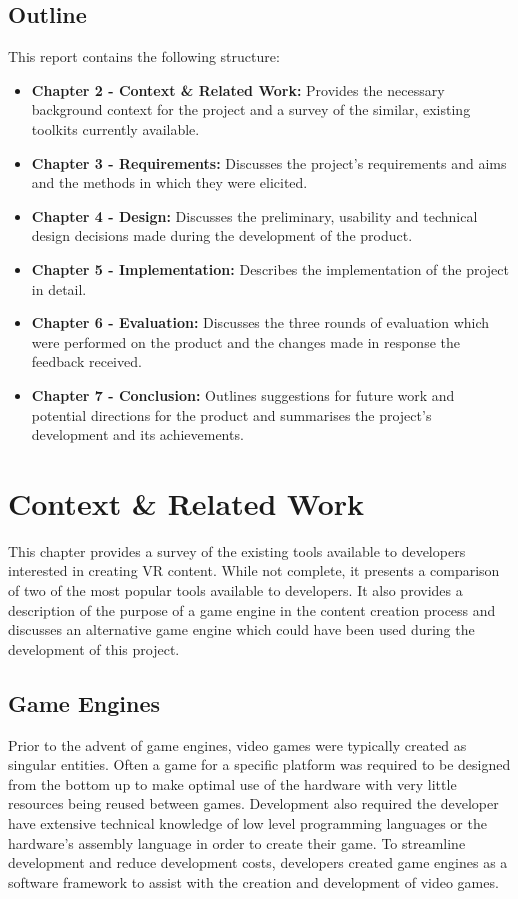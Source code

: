 \documentclass{l4proj}
\begin{document}
\section{Outline}
\label{sec:introductionoutline}
This report contains the following structure:
\begin{itemize}
    \item \textbf{Chapter 2 - Context \& Related Work:} Provides the necessary background context for the project and a survey of the similar, existing toolkits currently available.
    \item \textbf{Chapter 3 - Requirements:} Discusses the project's requirements and aims and the methods in which they were elicited.
    \item \textbf{Chapter 4 - Design:} Discusses the preliminary, usability and technical design decisions made during the development of the product.
    \item \textbf{Chapter 5 - Implementation:} Describes the implementation of the project in detail.  
    \item \textbf{Chapter 6 - Evaluation:} Discusses the three rounds of evaluation which were performed on the product and the changes made in response the feedback received.
    \item \textbf{Chapter 7 - Conclusion:} Outlines suggestions for future work and potential directions for the product and summarises the project's development and its achievements.
\end{itemize}

\chapter{Context \& Related Work}
\label{sec:contextchapter}
This chapter provides a survey of the existing tools available to developers interested in creating VR content. While not complete, it presents a comparison of two of the most popular tools available to developers. It also provides a description of the purpose of a game engine in the content creation process and discusses an alternative game engine which could have been used during the development of this project. 

\section{Game Engines}
\label{sec:contextgameengines}
Prior to the advent of game engines, video games were typically created as singular entities. Often a game for a specific platform was required to be designed from the bottom up to make optimal use of the hardware with very little resources being reused between games. Development also required the developer have extensive technical knowledge of low level programming languages or the hardware’s assembly language in order to create their game. To streamline development and reduce development costs, developers created game engines as a software framework to assist with the creation and development of video games. 
\end{document}
